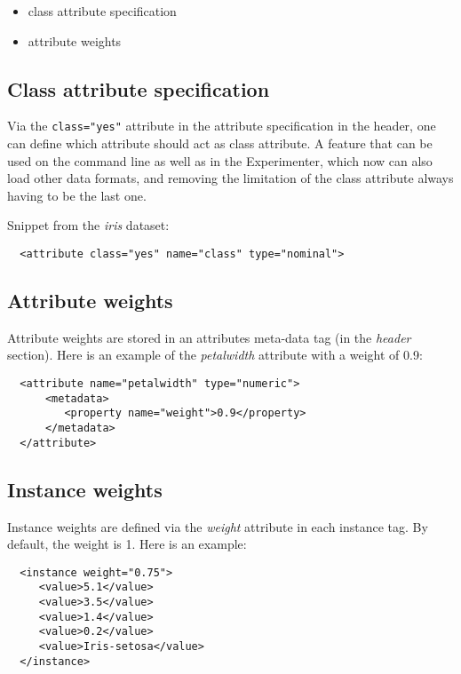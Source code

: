 \begin{itemize}
	\item class attribute specification
	\item attribute weights
\end{itemize}

\subsection{Class attribute specification}
Via the \texttt{class="yes"} attribute in the attribute specification in the header, one can define which attribute should act as class attribute. A feature that can be used on the command line as well as in the Experimenter, which now can also load other data formats, and removing the limitation of the class attribute always having to be the last one.

Snippet from the \textit{iris} dataset:

\begin{verbatim}
  <attribute class="yes" name="class" type="nominal">
\end{verbatim}

\subsection{Attribute weights}
Attribute weights are stored in an attributes meta-data tag (in the \textit{header} section). Here is an example of the \textit{petalwidth} attribute with a weight of 0.9:

\begin{verbatim}
  <attribute name="petalwidth" type="numeric">
      <metadata>
         <property name="weight">0.9</property>
      </metadata>
  </attribute>
\end{verbatim}

\subsection{Instance weights}
Instance weights are defined via the \textit{weight} attribute in each instance tag. By default, the weight is 1. Here is an example:

\begin{verbatim}
  <instance weight="0.75">
     <value>5.1</value>
     <value>3.5</value>
     <value>1.4</value>
     <value>0.2</value>
     <value>Iris-setosa</value>
  </instance>
\end{verbatim}

